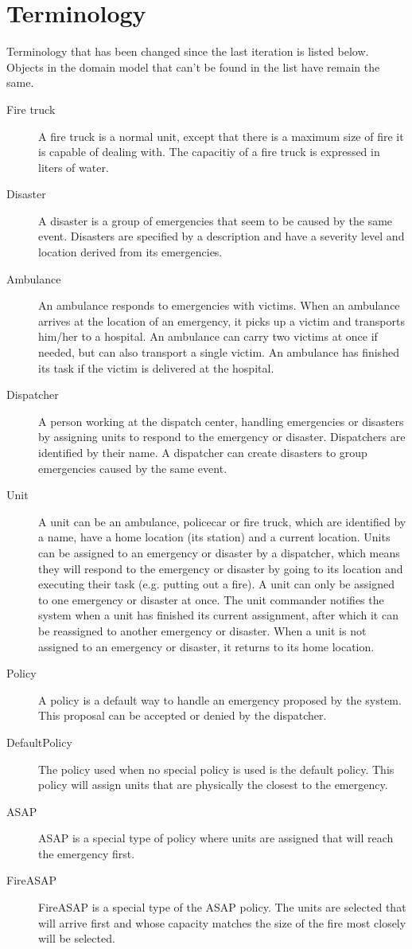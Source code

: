 \section{Terminology}
Terminology that has been changed since the last iteration is listed below. Objects in the domain model that can't be found in the list have remain the same.
\begin{description}
  \item[Fire truck] A fire truck is a normal unit, except that there is a maximum size of fire it is capable of dealing with. The capacitiy of a fire truck is expressed in liters of water.
  \item[Disaster] A disaster is a group of emergencies that seem to be caused by the same event. Disasters are specified by a description and have a severity level and location derived from its emergencies.
  \item[Ambulance] An ambulance responds to emergencies with victims. When an ambulance arrives at the location of an emergency, it picks up a victim and transports him/her to a hospital. An ambulance can carry two victims at once if needed, but can also transport a single victim. An ambulance has finished its task if the victim is delivered at the hospital. 
  \item[Dispatcher] A person working at the dispatch center, handling emergencies or disasters by assigning units to respond to the emergency or disaster. Dispatchers are identified by their name. A dispatcher can create disasters to group emergencies caused by the same event.
  \item[Unit] A unit can be an ambulance, policecar or fire truck, which are identified by a name, have a home location (its station) and a current location. Units can be assigned to an emergency or disaster by a dispatcher, which means they will respond to the emergency or disaster by going to its location and executing their task (e.g. putting out a fire). A unit can only be assigned to one emergency or disaster at once. The unit commander notifies the system when a unit has finished its current assignment, after which it can be reassigned to another emergency or disaster. When a unit is not assigned to an emergency or disaster, it returns to its home location.
  \item[Policy] A policy is a default way to handle an emergency proposed by the system. This proposal can be accepted or denied by the dispatcher.
  \item[DefaultPolicy] The policy used when no special policy is used is the default policy. This policy will assign units that are physically the closest to the emergency.
  \item[ASAP] ASAP is a special type of policy where units are assigned that will reach the emergency first.
  \item[FireASAP] FireASAP is a special type of the ASAP policy. The units are selected that will arrive first and whose capacity matches the size of the fire most closely will be selected.
\end{description}
